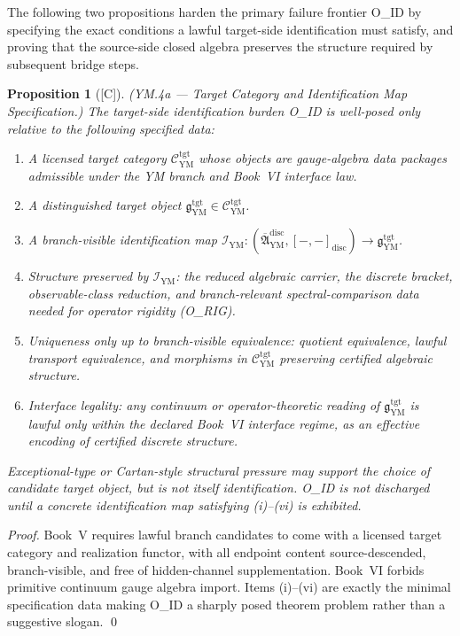 \documentclass[12pt,oneside]{amsbook}
\theoremstyle{plain}
\newtheorem{proposition}[theorem]{Proposition}
\theoremstyle{definition}
\theoremstyle{remark}
\newcommand{\status}[1]{\textup{[#1]}}
\begin{document}
The following two propositions harden the primary failure frontier
O\_ID by specifying the exact conditions a lawful target-side
identification must satisfy, and proving that the source-side closed
algebra preserves the structure required by subsequent bridge steps.

\begin{proposition}[\status{C}]\label{prop:YM4a}
\textup{(YM.4a --- Target Category and Identification Map
Specification.)}
The target-side identification burden O\_ID is well-posed only
relative to the following specified data:
\begin{enumerate}[label=\textup{(\roman*)}]
 \item A licensed target category $\mathcal{C}^{\mathrm{tgt}}_{\mathrm{YM}}$
 whose objects are gauge-algebra data packages admissible under
 the YM branch and Book~VI interface law.
 \item A distinguished target object
 $\mathfrak{g}^{\mathrm{tgt}}_{\mathrm{YM}} \in
 \mathcal{C}^{\mathrm{tgt}}_{\mathrm{YM}}$.
 \item A branch-visible identification map
 $\mathcal{I}_{\mathrm{YM}}:
 (\overline{\mathfrak{A}}^{\mathrm{disc}}_{\mathrm{YM}},
 [-,-]_{\mathrm{disc}}) \to
 \mathfrak{g}^{\mathrm{tgt}}_{\mathrm{YM}}$.
 \item Structure preserved by $\mathcal{I}_{\mathrm{YM}}$: the
 reduced algebraic carrier, the discrete bracket, observable-class
 reduction, and branch-relevant spectral-comparison data needed
 for operator rigidity (O\_RIG).
 \item Uniqueness only up to branch-visible equivalence: quotient
 equivalence, lawful transport equivalence, and
 morphisms in $\mathcal{C}^{\mathrm{tgt}}_{\mathrm{YM}}$
 preserving certified algebraic structure.
 \item Interface legality: any continuum or operator-theoretic
 reading of $\mathfrak{g}^{\mathrm{tgt}}_{\mathrm{YM}}$ is
 lawful only within the declared Book~VI interface regime, as an
 effective encoding of certified discrete structure.
\end{enumerate}
Exceptional-type or Cartan-style structural pressure may support the
choice of candidate target object, but is not itself identification.
O\_ID is not discharged until a concrete identification map
satisfying (i)--(vi) is exhibited.
\end{proposition}

\begin{proof}
Book~V requires lawful branch candidates to come with a licensed
target category and realization functor, with all endpoint content
source-descended, branch-visible, and free of hidden-channel
supplementation. Book~VI forbids primitive continuum gauge algebra
import. Items (i)--(vi) are exactly the minimal specification data
making O\_ID a sharply posed theorem problem rather than a suggestive
slogan. \qed
\end{proof}
\end{document}
